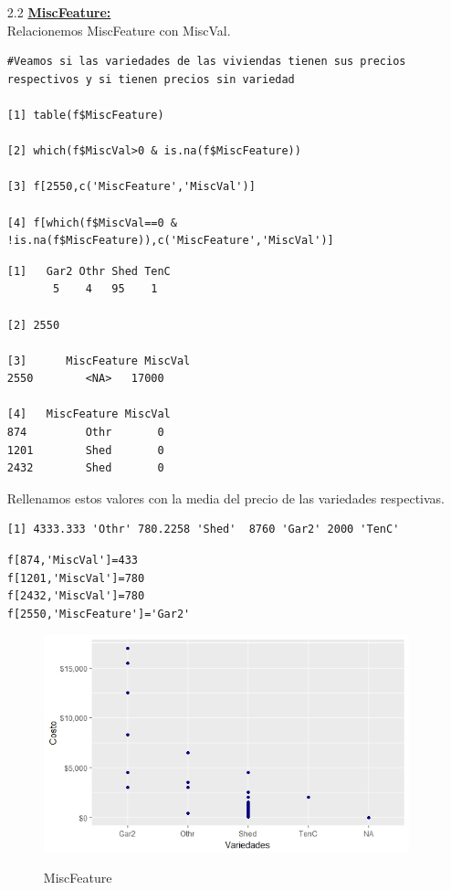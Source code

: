 \documentclass{report}
\begin{document}
\begin{itemize}
\begin{itemize}
\begin{itemize}
\newpage

\item[2.2] \textbf{\underline{MiscFeature:}}\\ 

Relacionemos MiscFeature con MiscVal.\\

\begin{lstlisting}[frame=single]
#Veamos si las variedades de las viviendas tienen sus precios respectivos y si tienen precios sin variedad

[1] table(f$MiscFeature)

[2] which(f$MiscVal>0 & is.na(f$MiscFeature))

[3] f[2550,c('MiscFeature','MiscVal')]

[4] f[which(f$MiscVal==0 & !is.na(f$MiscFeature)),c('MiscFeature','MiscVal')]
\end{lstlisting}

\begin{lstlisting}[frame=single]
[1]   Gar2 Othr Shed TenC 
       5    4   95    1 

[2] 2550

[3]      MiscFeature MiscVal
2550        <NA>   17000

[4]   MiscFeature MiscVal
874         Othr       0
1201        Shed       0
2432        Shed       0
\end{lstlisting}
\vspace{2mm}

Rellenamos estos valores con la media del precio de las variedades respectivas.\\

\begin{lstlisting}[frame=single]
[1] 4333.333 'Othr' 780.2258 'Shed'  8760 'Gar2' 2000 'TenC'
\end{lstlisting}

\begin{lstlisting}[frame=single]
f[874,'MiscVal']=433
f[1201,'MiscVal']=780
f[2432,'MiscVal']=780
f[2550,'MiscFeature']='Gar2'
\end{lstlisting}

\begin{figure}[h]
	\centering
	\includegraphics[scale=0.8]{Variedades.JPEG}
	\label{p1}
	\caption{MiscFeature}
\end{figure}


\end{itemize}
\end{itemize}
\end{itemize}
\end{document}
